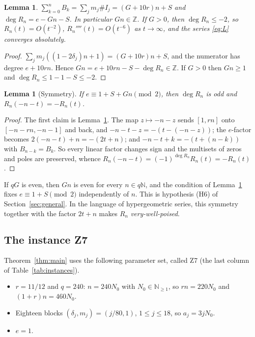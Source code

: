 \documentclass[11pt]{amsart}
\newtheorem{lemma}[theorem]{Lemma}
\theoremstyle{definition}
\theoremstyle{remark}
\numberwithin{equation}{section}
\newcommand{\NN}{\mathbb{N}}
\newcommand{\ZZ}{\mathbb{Z}}
\begin{document}
\begin{lemma}\label{lem:counts}
$\sum_{k=0}^nB_k=\sum_jm_j\#I_j=(G+10r)n+S$ and $\deg R_n=e-Gn-S$. In particular $Gn\in\ZZ$. If $G>0$, then
$\deg R_n\le-2$, so $R_n(t)=O(t^{-2})$, $R_n''''(t)=O(t^{-6})$ as $t\to\infty$, and the series \eqref{eq:L}
converges absolutely.
\end{lemma}

\begin{proof}
$\sum_jm_j((1-2\delta_j)n+1)=(G+10r)n+S$, and the numerator has degree $e+10rn$. Hence
$Gn=e+10rn-S-\deg R_n\in\ZZ$. If $G>0$ then $Gn\ge1$ and $\deg R_n\le1-1-S\le-2$.
\end{proof}

\begin{lemma}[Symmetry]\label{lem:sym}
If $e\equiv1+S+Gn\pmod2$, then $\deg R_n$ is odd and $R_n(-n-t)=-R_n(t)$.
\end{lemma}

\begin{proof}
The first claim is Lemma~\ref{lem:counts}. The map $z\mapsto-n-z$ sends $[1,rn]$ onto $[-n-rn,-n-1]$ and back,
and $-n-t-z=-(t-(-n-z))$; the $e$-factor becomes $2(-n-t)+n=-(2t+n)$; and $-n-t+k=-(t+(n-k))$ with
$B_{n-k}=B_k$. So every linear factor changes sign and the multisets of zeros and poles are preserved, whence
$R_n(-n-t)=(-1)^{\deg R_n}R_n(t)=-R_n(t)$.
\end{proof}

If $qG$ is even, then $Gn$ is even for every $n\in q\NN$, and the condition of Lemma~\ref{lem:sym} fixes
$e\equiv1+S\pmod2$ independently of $n$. This is hypothesis (H6) of Section~\ref{sec:general}. In the language
of hypergeometric series, this symmetry together with the factor $2t+n$ makes $R_n$ \emph{very-well-poised}.

\subsection{The instance Z7}
Theorem~\ref{thm:main} uses the following parameter set, called Z7 (the last column of
Table~\ref{tab:instances}).
\begin{itemize}
\item $r=11/12$ and $q=240$: $n=240N_0$ with $N_0\in\NN_{\ge1}$, so $rn=220N_0$ and $(1+r)n=460N_0$.
\item Eighteen blocks $(\delta_j,m_j)=(j/80,1)$, $1\le j\le18$, so $a_j=3jN_0$.
\item $e=1$.
\end{itemize}
\end{document}
